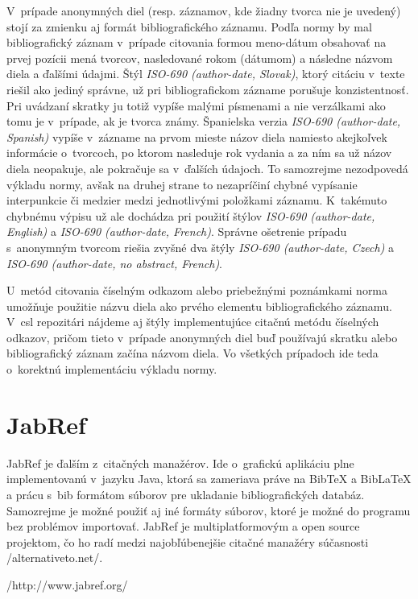 \documentclass{fithesis3}
\begin{document}
	V~prípade anonymných diel (resp. záznamov, kde žiadny tvorca nie je uvedený) stojí za zmienku aj formát bibliografického záznamu. Podľa normy by mal bibliografický záznam v~prípade citovania formou meno-dátum obsahovať na prvej pozícii mená tvorcov, nasledované rokom (dátumom) a následne názvom diela a ďalšími údajmi. Štýl \textit{ISO-690 (author-date, Slovak)}, ktorý citáciu v~texte riešil ako jediný správne, už pri bibliografickom zázname porušuje konzistentnosť. Pri uvádzaní skratky  ju totiž vypíše malými písmenami a nie verzálkami ako tomu je v~prípade, ak je tvorca známy. Španielska verzia \textit{ISO-690 (author-date, Spanish)} vypíše v~zázname na prvom mieste názov diela namiesto akejkoľvek informácie o~tvorcoch, po ktorom nasleduje rok vydania a za ním sa už názov diela neopakuje, ale pokračuje sa v~ďalších údajoch. To samozrejme nezodpovedá výkladu normy, avšak na druhej strane to nezapríčiní chybné vypísanie interpunkcie či medzier medzi jednotlivými položkami záznamu. K~takémuto chybnému výpisu už ale dochádza pri použití štýlov \textit{ISO-690 (author-date, English)} a \textit{ISO-690 (author-date, French)}. Správne ošetrenie prípadu s~anonymným tvorcom riešia zvyšné dva štýly \textit{ISO-690 (author-date, Czech)} a \textit{ISO-690 (author-date, no abstract, French)}.
	
	U~metód citovania číselným odkazom alebo priebežnými poznámkami norma umožňuje použitie názvu diela ako prvého elementu bibliografického záznamu. V~csl repozitári nájdeme aj štýly implementujúce citačnú metódu číselných odkazov, pričom tieto v~prípade anonymných diel buď používajú skratku  alebo bibliografický záznam začína názvom diela. Vo všetkých prípadoch ide teda o~korektnú implementáciu výkladu normy.
	
	\section{JabRef}
	
	JabRef je ďalším z~citačných manažérov. Ide o~grafickú aplikáciu plne implementovanú v~jazyku Java, ktorá sa zameriava práve na BibTeX a BibLaTeX a prácu s~bib formátom súborov pre ukladanie bibliografických databáz. Samozrejme je možné použiť aj iné formáty súborov, ktoré je možné do programu bez problémov importovať. JabRef je multiplatformovým a open source projektom, čo ho radí medzi najobľúbenejšie citačné manažéry súčasnosti /alternativeto.net/.
	
	/http://www.jabref.org/
	
\end{document}

